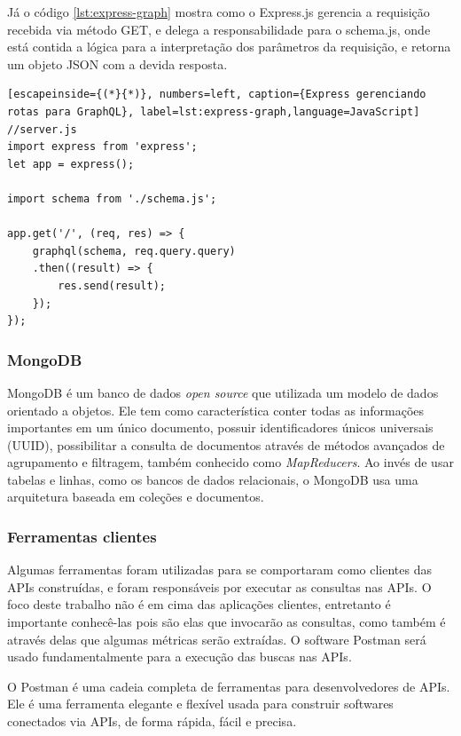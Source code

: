 Já o código \ref{lst:express-graph} mostra como o Express.js gerencia a requisição recebida via método GET, e delega a responsabilidade para o \textup{schema.js}, onde está contida a lógica para a interpretação dos parâmetros da requisição, e retorna um objeto JSON com a devida resposta.

\begin{lstlisting}[escapeinside={(*}{*)}, numbers=left, caption={Express gerenciando rotas para GraphQL}, label=lst:express-graph,language=JavaScript]
//server.js
import express from 'express';
let app = express();

import schema from './schema.js';

app.get('/', (req, res) => {
    graphql(schema, req.query.query)
    .then((result) => {
        res.send(result);
    });
});

\end{lstlisting}

\subsubsection*{MongoDB}

MongoDB é um banco de dados \textit{open source} que utilizada um modelo de dados orientado a objetos. Ele tem como característica conter todas as informações importantes em um único documento, possuir identificadores únicos universais (UUID), possibilitar a consulta de documentos através de métodos avançados de agrupamento e filtragem, também conhecido como \textit{MapReducers}. Ao invés de usar tabelas e linhas, como os bancos de dados relacionais, o MongoDB usa uma arquitetura baseada em coleções e documentos.


\subsubsection*{Ferramentas clientes}

Algumas ferramentas foram utilizadas para se comportaram como clientes das APIs construídas, e foram responsáveis por executar as consultas nas APIs. O foco deste trabalho não é em cima das aplicações clientes, entretanto é importante conhecê-las pois são elas que invocarão as consultas, como também é através delas que algumas métricas serão extraídas. O software Postman será usado fundamentalmente para a execução das buscas nas APIs.

O Postman é uma cadeia completa de ferramentas para desenvolvedores de APIs. Ele é uma ferramenta elegante e flexível usada para construir softwares conectados via APIs, de forma rápida, fácil e precisa.

